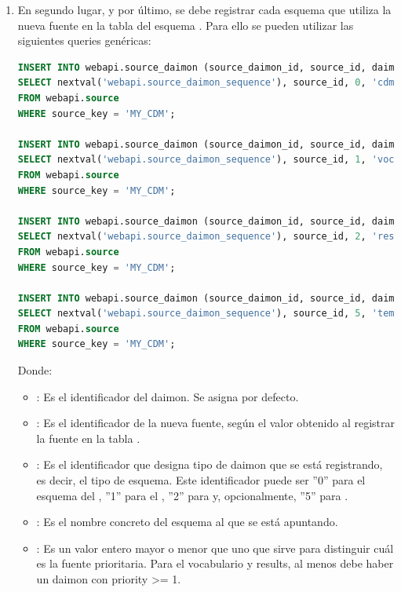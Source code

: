 \begin{enumerate}
    \item En segundo lugar, y por último, se debe registrar cada esquema que utiliza la nueva fuente en la tabla  del esquema . Para ello se pueden utilizar las siguientes queries genéricas:

\begin{lstlisting}[language=sql]
INSERT INTO webapi.source_daimon (source_daimon_id, source_id, daimon_type, table_qualifier, priority) 
SELECT nextval('webapi.source_daimon_sequence'), source_id, 0, 'cdm', 0
FROM webapi.source
WHERE source_key = 'MY_CDM';

INSERT INTO webapi.source_daimon (source_daimon_id, source_id, daimon_type, table_qualifier, priority) 
SELECT nextval('webapi.source_daimon_sequence'), source_id, 1, 'vocab', 1
FROM webapi.source
WHERE source_key = 'MY_CDM';

INSERT INTO webapi.source_daimon (source_daimon_id, source_id, daimon_type, table_qualifier, priority) 
SELECT nextval('webapi.source_daimon_sequence'), source_id, 2, 'results', 1
FROM webapi.source
WHERE source_key = 'MY_CDM';

INSERT INTO webapi.source_daimon (source_daimon_id, source_id, daimon_type, table_qualifier, priority) 
SELECT nextval('webapi.source_daimon_sequence'), source_id, 5, 'temp', 0
FROM webapi.source
WHERE source_key = 'MY_CDM';
\end{lstlisting}

    Donde:
    \begin{itemize}
        \item {}: Es el identificador del daimon. Se asigna por defecto.
        \item {}: Es el identificador de la nueva fuente, según el valor obtenido al registrar la fuente en la tabla .
        \item {}: Es el identificador que designa tipo de daimon que se está registrando, es decir, el tipo de esquema. Este identificador puede ser ''0'' para el esquema del , ''1'' para el , ''2'' para  y, opcionalmente, ''5'' para .
        \item {}: Es el nombre concreto del esquema al que se está apuntando.
        \item {}: Es un valor entero mayor o menor que uno que sirve para distinguir cuál es la fuente prioritaria. Para el vocabulario y results, al menos debe haber un daimon con priority >= 1.  
    \end{itemize}


\end{enumerate}
